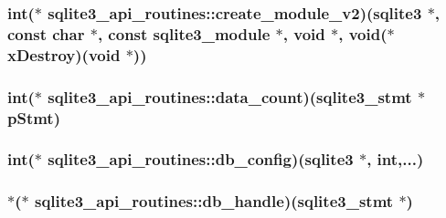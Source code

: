 \hypertarget{structsqlite3__api__routines_ad95940b07bd59f087160cf3a3428c8fa}{
\subsubsection[{create\-\_\-module\-\_\-v2}]{\setlength{\rightskip}{0pt plus 5cm}int($\ast$ sqlite3\-\_\-api\-\_\-routines\-::create\-\_\-module\-\_\-v2)({\bf sqlite3} $\ast$, const char $\ast$, const {\bf sqlite3\-\_\-module} $\ast$, void $\ast$, void($\ast$x\-Destroy)(void $\ast$))}}\label{structsqlite3__api__routines_ad95940b07bd59f087160cf3a3428c8fa}
\hypertarget{structsqlite3__api__routines_aea0a7b7483770202ef9eae88b4eb70cd}{
\subsubsection[{data\-\_\-count}]{\setlength{\rightskip}{0pt plus 5cm}int($\ast$ sqlite3\-\_\-api\-\_\-routines\-::data\-\_\-count)({\bf sqlite3\-\_\-stmt} $\ast$p\-Stmt)}}\label{structsqlite3__api__routines_aea0a7b7483770202ef9eae88b4eb70cd}
\hypertarget{structsqlite3__api__routines_a60ceed179513c5ac09b0ed39c725dbf6}{
\subsubsection[{db\-\_\-config}]{\setlength{\rightskip}{0pt plus 5cm}int($\ast$ sqlite3\-\_\-api\-\_\-routines\-::db\-\_\-config)({\bf sqlite3} $\ast$, int,...)}}\label{structsqlite3__api__routines_a60ceed179513c5ac09b0ed39c725dbf6}
\hypertarget{structsqlite3__api__routines_a243ede93aa98a2a339cdd693ca2855e1}{
\subsubsection[{db\-\_\-handle}]{$\ast$($\ast$ sqlite3\-\_\-api\-\_\-routines\-::db\-\_\-handle)({\bf sqlite3\-\_\-stmt} $\ast$)}}\label{structsqlite3__api__routines_a243ede93aa98a2a339cdd693ca2855e1}
